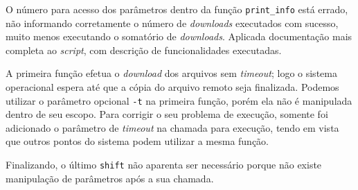 \documentclass{article}
\begin{document}
O número para acesso dos parâmetros dentro da função \texttt{print\_info} está
errado, não informando corretamente o número de \textit{downloads} executados
com sucesso, muito menos executando o somatório de \textit{downloads}. Aplicada
documentação mais completa ao \textit{script}, com descrição de funcionalidades
executadas.

A primeira função efetua o \textit{download} dos arquivos sem \textit{timeout};
logo o sistema operacional espera até que a cópia do arquivo remoto seja
finalizada. Podemos utilizar o parâmetro opcional \texttt{-t} na primeira
função, porém ela não é manipulada dentro de seu escopo. Para corrigir o seu
problema de execução, somente foi adicionado o parâmetro de \textit{timeout} na
chamada para execução, tendo em vista que outros pontos do sistema podem
utilizar a mesma função.

Finalizando, o último \texttt{shift} não aparenta ser necessário porque não
existe manipulação de parâmetros após a sua chamada.
\end{document}

